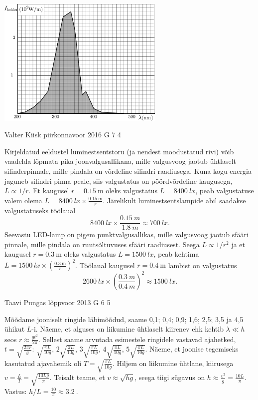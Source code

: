 \documentclass[11pt, twoside]{article}
\begin{document}
{{\begin{center}
	\includegraphics[width=80mm]{2011-lahg-04-intensity}
\end{center}
\fi
}

{Valter Kiisk} %
{piirkonnavoor} %
{2016} %
{G 7} %
{4} %
{

\ifSolution
Kirjeldatud eeldustel luminestsentstoru (ja nendest moodustatud rivi) võib vaadelda lõpmata pika joonvalgusallikana, mille valgusvoog jaotub ühtlaselt silinderpinnale, mille pindala on võrdeline silindri raadiusega. Kuna kogu energia jaguneb silindri pinna peale, siis valgustatus on pöördvõrdeline kaugusega, $L \propto 1/r$. Et kaugusel $r=\SI{0.15}{\meter}$ oleks valgustatus $L=\SI{8400}{lx}$, peab valgustatuse valem olema $L=\SI{8400}{lx}\times \frac{\SI{0.15}{\meter}} r$. Järelikult luminestsentslampide abil saadakse valgustatuseks töölaual
\[
\SI{8400}{lx}\times\frac{\SI{0.15}{m}}{\SI{1.8}{m}}\approx\SI{700}{lx}.
\]
Seevastu LED-lamp on pigem punktvalgusallikas, mille valgusvoog jaotub sfääri pinnale, mille pindala on ruutsõltuvuses sfääri raadiusest. Seega $L \propto 1/r^2$ ja et kaugusel $r=\SI{0.3}{\meter}$ oleks valgustatus $L=\SI{1500}{lx}$, peab kehtima $L=\SI{1500}{lx}\times \left(\frac{\SI{0.3}{\meter}} {r}\right)^2$. Töölaual kaugusel $r=\SI{0.4}{\meter}$ lambist on valgustatus
\[
\SI{2600}{lx}\times\left(\frac{\SI{0.3}{m}}{\SI{0.4}{m}}\right)^2\approx\SI{1500}{lx}.
\]
\fi
}

{Taavi Pungas} %
{lõppvoor} %
{2013} %
{G 6} %
{5} %
{

\ifSolution
Mõõdame jooniselt ringide läbimõõdud, saame 0,1; 0,4; 0,9; 1,6; 2,5; 3,5 ja 4,5 ühikut $L$-i. Näeme, et alguses on liikumine ühtlaselt kiirenev ehk kehtib $\lambda \ll h$ seos $r \approx \frac{gt^2}{2 \pi}$. Sellest saame arvutada esimestele ringidele vastavad ajahetked, $t = \sqrt{\frac{2 \pi r}{g}}$: $\sqrt{\frac{\pi L}{10 g}}$, $2 \sqrt{\frac{\pi L}{10 g}}$, $3 \sqrt{\frac{\pi L}{10 g}}$, $4 \sqrt{\frac{\pi L}{10 g}}$, $5 \sqrt{\frac{\pi L}{10 g}}$. Näeme, et joonise tegemiseks kasutatud ajavahemik oli $T=\sqrt{\frac{\pi L}{10 g}}$.
Hiljem on liikumine ühtlane, kiirusega $v=\frac{L}{T}=\sqrt{\frac{10 L g}{\pi}}$. Teisalt teame, et $v \approx \sqrt{hg}$, seega tiigi sügavus on $h \approx \frac{v^2}{g} = \frac{10 L}{\pi}$. Vastus: $h/L = \frac{10}{\pi} \approx \SI{3,2}{}$.
\fi
}

}
\end{document}
